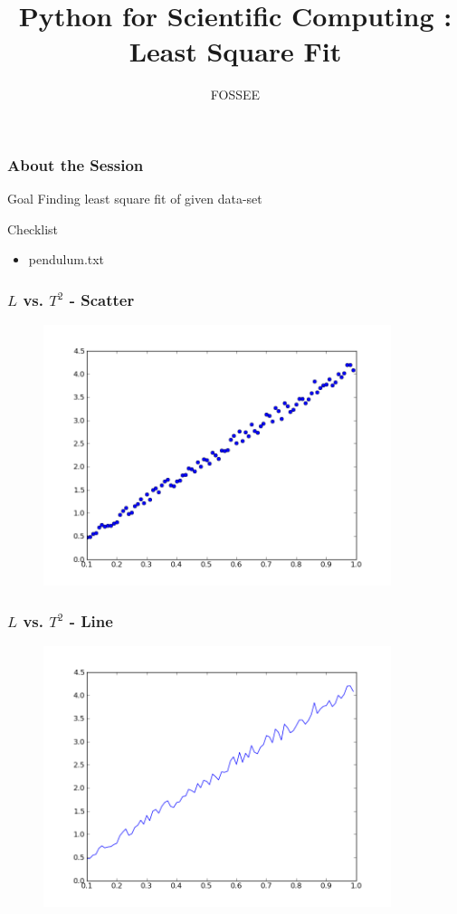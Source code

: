 \documentclass[14pt,compress]{beamer}
\title{Python for Scientific Computing : Least Square Fit}
\author[FOSSEE] {FOSSEE}
\institute[IIT Bombay] {Department of Aerospace Engineering\\IIT Bombay}
\date{}
\begin{document}
\begin{frame}
  \maketitle
\end{frame}

\begin{frame}
  \frametitle{About the Session}
  \begin{block}{Goal}
Finding least square fit of given data-set
  \end{block}
  \begin{block}{Checklist}
    \begin{itemize}
    \item pendulum.txt
  \end{itemize}
  \end{block}
\end{frame}

\begin{frame}[fragile]
  \frametitle{$L$ vs. $T^2$ - Scatter}
  \vspace{-0.15in}
  \begin{figure}
    \includegraphics[width=4in]{data/L-Tsq-points}
  \end{figure}
\end{frame}

\begin{frame}[fragile]
  \frametitle{$L$ vs. $T^2$ - Line}
  \vspace{-0.15in}
  \begin{figure}
    \includegraphics[width=4in]{data/L-Tsq-Line}
  \end{figure}
\end{frame}
\end{document}
